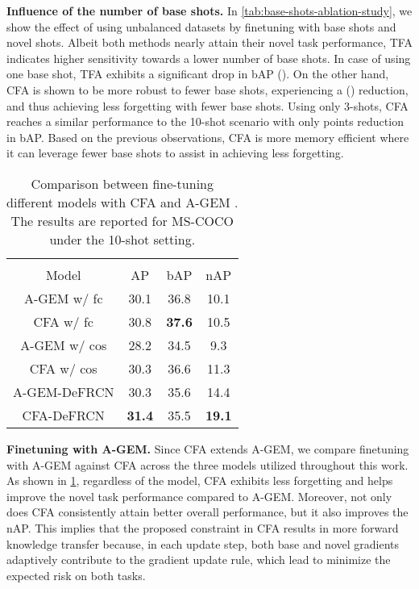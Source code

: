 \documentclass[10pt,twocolumn,letterpaper]{article}
\begin{document}
\textbf{Influence of the number of base shots.} In \cref{tab:base-shots-ablation-study}, we show the effect of using unbalanced datasets by finetuning with  base shots and  novel shots. Albeit both methods nearly attain their novel task performance, TFA indicates higher sensitivity towards a lower number of base shots. In  case of using one base shot, TFA exhibits a significant drop in bAP (). On the other hand, CFA is shown to be more robust to fewer base shots, experiencing a () reduction, and thus achieving less forgetting with fewer base shots. Using only 3-shots, CFA reaches a similar performance to the 10-shot scenario with only  points reduction in bAP. Based on the previous observations, CFA is more memory efficient where it can leverage fewer base shots to assist in achieving less forgetting.  
\begin{table}[t!] \centering
	\setlength{\tabcolsep}{3.0mm}
	\scalebox{0.8}
	{\begin{tabular}{c|ccc}
\toprule[1.1pt]
			\multicolumn{1}{c|}{} &\multicolumn{3}{c}{}\\
			\multicolumn{1}{c|}{\multirow{-2}{*}{Model}}  & \multicolumn{1}{c}{\multirow{-2}{*}{AP}} & \multicolumn{1}{c}{\multirow{-2}{*}{bAP}}  &  \multicolumn{1}{c}{\multirow{-2}{*}{nAP}}            \\
			\midrule[0.9pt]
			  A-GEM w/ fc & 30.1 & 36.8 & 10.1\\
			  \rowcolor[HTML]{EFEFEF}
			  CFA w/ fc & 30.8 & \textbf{37.6} & 10.5 \\\midrule[1pt]
			  A-GEM w/ cos & 28.2 & 34.5 & 9.3  \\
			  \rowcolor[HTML]{EFEFEF}
			  CFA w/ cos & 30.3 & 36.6 & 11.3 \\\midrule[1pt]
			  A-GEM-DeFRCN & 30.3 & 35.6 & 14.4 \\
			  \rowcolor[HTML]{EFEFEF}
			  CFA-DeFRCN & \textbf{31.4} & 35.5 & \textbf{19.1}\\
			  
			\bottomrule[1.1pt]
	\end{tabular}}
	\vspace{-0.2cm}
	\caption{Comparison between fine-tuning different models with CFA and A-GEM \cite{agem}. The results are reported for MS-COCO under the 10-shot setting. }
 	\vspace{-1em}
	\label{tab:cl-ablation-study}
\end{table}

 
\textbf{Finetuning with A-GEM.} Since CFA extends A-GEM, we compare finetuning with A-GEM against CFA across the three models utilized throughout this work. As shown in \cref{tab:cl-ablation-study}, regardless of the model, CFA exhibits less forgetting and helps improve the novel task performance compared to A-GEM. Moreover, not only does CFA consistently attain better overall performance, but it also improves the nAP. This implies that the proposed constraint in CFA results in more forward knowledge transfer because, in each update step, both base and novel gradients adaptively contribute to the gradient update rule, which lead to minimize the expected risk on both tasks.
\end{document}

